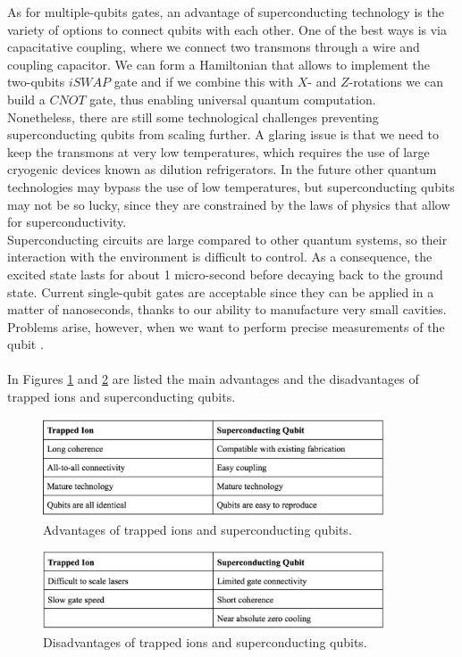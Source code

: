 As for multiple-qubits gates, an advantage of superconducting technology is the variety of options to connect qubits with each other. One of the best ways is via capacitative coupling, where we connect two transmons through a wire and coupling capacitor. We can form a Hamiltonian that allows to implement the two-qubits $iSWAP$ gate and if we combine this with $X$- and $Z$-rotations we can build a $CNOT$ gate, thus enabling universal quantum computation. \\
Nonetheless, there are still some technological challenges preventing superconducting qubits from scaling further. A glaring issue is that we need to keep the transmons at very low temperatures, which requires the use of large cryogenic devices known as dilution refrigerators. In the future other quantum technologies may bypass the use of low temperatures, but superconducting qubits may not be so lucky, since they are constrained by the laws of physics that allow for superconductivity. \\
Superconducting circuits are large compared to other quantum systems, so their interaction with the environment is difficult to control. As a consequence, the excited state lasts for about 1 micro-second before decaying back to the ground state. Current single-qubit gates are acceptable since they can be applied in a matter of nanoseconds, thanks to our ability to manufacture very small cavities. Problems arise, however, when we want to perform precise measurements of the qubit \cite{BibEntry2022Aug}. \\
\\
In Figures \ref{Advantages} and \ref{Disadvantages} are listed the main advantages and the disadvantages of trapped ions and superconducting qubits.
\begin{figure}[ht]
  \centering
  \includegraphics[width=0.9\textwidth]{figures/Advantages trapped ions vs superconducting.png}
  \caption{Advantages of trapped ions and superconducting qubits.} \label{Advantages}
\end{figure}
\begin{figure}[ht]
  \centering
  \includegraphics[width=0.9\textwidth]{figures/Disadvantages trapped ions vs superconducting.png}
  \caption{Disadvantages of trapped ions and superconducting qubits.} \label{Disadvantages}
\end{figure}